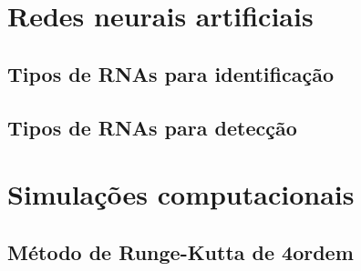 \section{Redes neurais artificiais}

\subsection{Tipos de RNAs para identificação}

\subsection{Tipos de RNAs para detecção}

\section{Simulações computacionais}

\subsection{Método de Runge-Kutta de 4\textordfeminine ordem}
